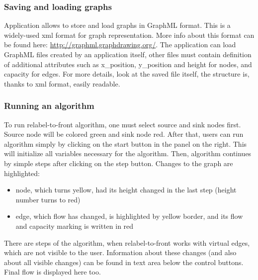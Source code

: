 \documentclass[a4paper,11pt]{article}
\begin{document}

\subsubsection*{Saving and loading graphs}
Application allows to store and load graphs in GraphML format. This is a widely-used 
xml format for graph representation. More info about this format can be found here: 
\url{http://graphml.graphdrawing.org/}. The application can load GraphML files created
by an application itself, other files must contain definition of additional attributes
such as x\_position, y\_position and height for nodes, and capacity for edges. For more
details, look at the saved file itself, the structure is, thanks to xml format, 
easily readable. 

\subsubsection*{Running an algorithm}
To run relabel-to-front algorithm, one must select source and sink nodes first. 
Source node will be colored green and sink node red. After that, users can run 
algorithm simply by clicking on the start button in the panel on the right. 
This will initialize all variables necessary for the algorithm. Then, algorithm 
continues by simple steps after clicking on the step button. Changes to the 
graph are highlighted:
\begin{itemize}
\item node, which turns yellow, had its height changed in the last step (height 
number turns to red)
\item edge, which flow has changed, is highlighted by yellow border, and its 
flow and capacity marking is written in red
\end{itemize}

There are steps of the algorithm, when relabel-to-front works with virtual edges,
which are not visible to the user. Information about these changes (and also 
about all visible changes) can be found in text area below the control buttons.
Final flow is displayed here too.

\end{document}
